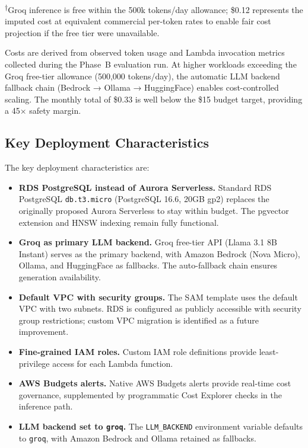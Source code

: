 \noindent\textsuperscript{$\dagger$}Groq inference is free within the 500k tokens/day allowance; \$0.12 represents the imputed cost at equivalent commercial per-token rates to enable fair cost projection if the free tier were unavailable.

\noindent Costs are derived from observed token usage and Lambda invocation metrics collected during the Phase~B evaluation run. At higher workloads exceeding the Groq free-tier allowance (500,000 tokens/day), the automatic LLM backend fallback chain (Bedrock → Ollama → HuggingFace) enables cost-controlled scaling. The monthly total of \$0.33 is well below the \$15 budget target, providing a 45$\times$ safety margin.

\subsection*{Key Deployment Characteristics}

The key deployment characteristics are:

\begin{itemize}[leftmargin=0.5in]
  \item \textbf{RDS PostgreSQL instead of Aurora Serverless.} Standard RDS PostgreSQL \texttt{db.t3.micro} (PostgreSQL 16.6, 20GB gp2) replaces the originally proposed Aurora Serverless to stay within budget. The pgvector extension and HNSW indexing remain fully functional.
  \item \textbf{Groq as primary LLM backend.} Groq free-tier API (Llama 3.1 8B Instant) serves as the primary backend, with Amazon Bedrock (Nova Micro), Ollama, and HuggingFace as fallbacks. The auto-fallback chain ensures generation availability.
  \item \textbf{Default VPC with security groups.} The SAM template uses the default VPC with two subnets. RDS is configured as publicly accessible with security group restrictions; custom VPC migration is identified as a future improvement.
  \item \textbf{Fine-grained IAM roles.} Custom IAM role definitions provide least-privilege access for each Lambda function.
  \item \textbf{AWS Budgets alerts.} Native AWS Budgets alerts provide real-time cost governance, supplemented by programmatic Cost Explorer checks in the inference path.
  \item \textbf{LLM backend set to \texttt{groq}.} The \texttt{LLM\_BACKEND} environment variable defaults to \texttt{groq}, with Amazon Bedrock and Ollama retained as fallbacks.
\end{itemize}

